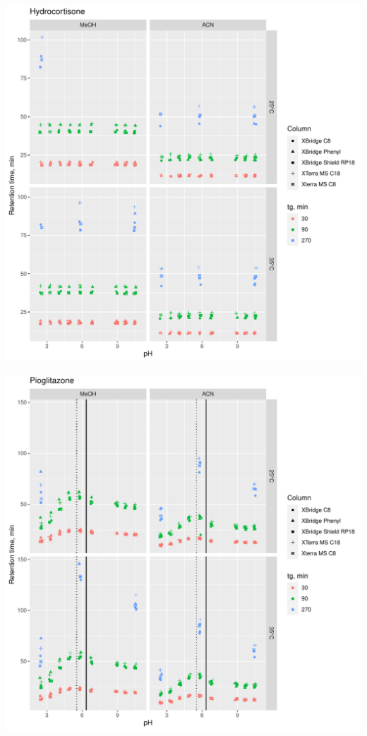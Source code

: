 \documentclass[
]{article}
\begin{document}
\newpage{}

\includegraphics{../figures/rawdata/Hydrocortisone.pdf}

\newpage{}

\includegraphics{../figures/rawdata/Pioglitazone.pdf}
\end{document}
